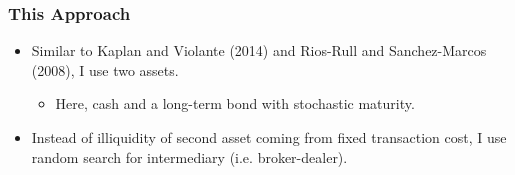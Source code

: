 \documentclass{beamer}
\begin{document}
\begin{frame}
\frametitle{This Approach}

\begin{itemize}[<+->]
\item Similar to Kaplan and Violante (2014) and Rios-Rull and Sanchez-Marcos (2008), I use two assets. 
\bigskip

\begin{itemize}[<+->]
\item Here, cash and a long-term bond with stochastic maturity.
\end{itemize}

\bigskip
\item Instead of illiquidity of second asset coming from fixed transaction cost, I use random search for intermediary (i.e. broker-dealer).
\end{itemize}

\end{frame}
\end{document}
